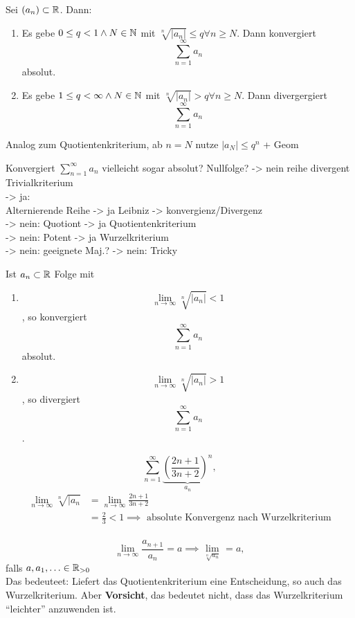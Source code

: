 \begin{subproposition}[(Wurzelkriterium)]
	Sei $( a_n) \subset \mathbb{R} $. Dann:
	\begin{enumerate}[label=(\roman*)]
		\item Es gebe $ 0 \leq q < 1 \wedge N \in \mathbb{N} $ mit $ \sqrt[n]{|a_n|} \leq q \forall n \geq N $.
			Dann konvergiert
			\[ \sum_{n=1}^{\infty} a_n \]
			absolut.
		\item Es gebe $ 1 \leq q < \infty \wedge N \in \mathbb{N} $ mit $ \sqrt[n]{|a_n|} > q \forall n \geq N $.
			Dann divergergiert
			\[ \sum_{n=1}^{\infty} a_n \]
	\end{enumerate}
\end{subproposition}
\begin{subproof*}
	Analog zum Quotientenkriterium, ab $ n = N $ nutze $ | a_N | \leq q^n $ + Geom
\end{subproof*}
\begin{subexample*}
	{\color{yellow} Konvergiert $ \sum_{n=1}^{\infty} a_n $ vielleicht sogar absolut?}
	Nullfolge? -> nein reihe divergent Trivialkriterium\\
	-> ja:\\
	Alternierende Reihe -> ja Leibniz -> konvergienz/Divergenz\\
	-> nein: Quotiont -> ja Quotientenkriterium\\
	-> nein: Potent -> ja Wurzelkriterium\\
	-> nein: geeignete Maj.? -> nein: Tricky
\end{subexample*}

\begin{subcorollary}
	Ist $ a_n \subset \mathbb{R} $ Folge mit
	\begin{enumerate}[label=(\roman*)]
		\item \[ \lim_{n\to\infty} \sqrt[n]{|a_n|} < 1 \] , so konvergiert \[ \sum_{n=1}^{\infty} a_n \] absolut.
		\item \[ \lim_{n\to\infty} \sqrt[n]{|a_n|} > 1 \] , so divergiert \[ \sum_{n=1}^{\infty} a_n \].
	\end{enumerate}
\end{subcorollary}

\begin{subexample}
	\[\sum_{n=1}^{\infty} \underbrace{ \left( \frac{2n + 1}{3n + 2} \right)^n}_{a_n}, \]
	\begin{align*}
		\lim_{n\to\infty} \sqrt[n]{|a_n} &= \lim_{n\to\infty} \frac{2n + 1}{3n+2}\\
		~&= \frac{2}{3} < 1 \implies \text{ absolute Konvergenz nach Wurzelkriterium}\\
	\end{align*}
\end{subexample}
\[\lim_{n\to\infty} \frac{a_{n+1}}{a_n} = a \implies \lim_{\sqrt[n]{a_n}} = a,\]
falls $a, a_1, \dotsc \in \mathbb{R}_{>0} $\\
Das bedeuteet: Liefert das Quotientenkriterium eine Entscheidung, so auch das Wurzelkriterium. Aber \textbf{Vorsicht}, das bedeutet nicht, dass das Wurzelkriterium ``leichter'' anzuwenden ist.

